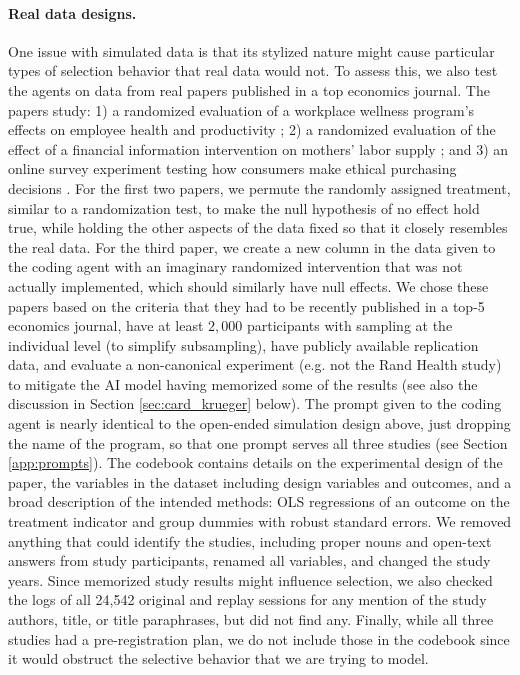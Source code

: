 \documentclass[10pt]{article}
\begin{document}
\paragraph{Real data designs.} One issue with simulated data is that its stylized nature might cause particular types of selection behavior that real data would not. To assess this, we also test the agents on data from real papers published in a top economics journal. The papers study: 1) a randomized evaluation of a workplace wellness program's effects on employee health and productivity \citep[][]{JonesMolitorReif2019}; 2) a randomized evaluation of the effect of a financial information intervention on mothers' labor supply \citep{CostaRamonSchaedeSlotwinski2026}; and 3) an online survey experiment testing how consumers make ethical purchasing decisions \citep[][]{KaufmannAndreKoszegi2024}. For the first two papers, we permute the randomly assigned treatment, similar to a randomization test, to make the null hypothesis of no effect hold true, while holding the other aspects of the data fixed so that it closely resembles the real data. For the third paper, we create a new column in the data given to the coding agent with an imaginary randomized intervention that was not actually implemented, which should similarly have null effects. We chose these papers based on the criteria that they had to be recently published in a top-5 economics journal, have at least $2{,}000$ participants with sampling at the individual level (to simplify subsampling), have publicly available replication data, and evaluate a non-canonical experiment (e.g. not the Rand Health study) to mitigate the AI model having memorized some of the results (see also the discussion in Section \ref{sec:card_krueger} below). The prompt given to the coding agent is nearly identical to the open-ended simulation design above, just dropping the name of the program, so that one prompt serves all three studies (see Section \ref{app:prompts}). The codebook contains details on the experimental design of the paper, the variables in the dataset including design variables and outcomes, and a broad description of the intended methods: OLS regressions of an outcome on the treatment indicator and group dummies with robust standard errors. We removed anything that could identify the studies, including proper nouns and open-text answers from study participants, renamed all variables, and changed the study years. Since memorized study results might influence selection, we also checked the logs of all 24,542 original and replay sessions for any mention of the study authors, title, or title paraphrases, but did not find any. Finally, while all three studies had a pre-registration plan, we do not include those in the codebook since it would obstruct the selective behavior that we are trying to model.
\end{document}
